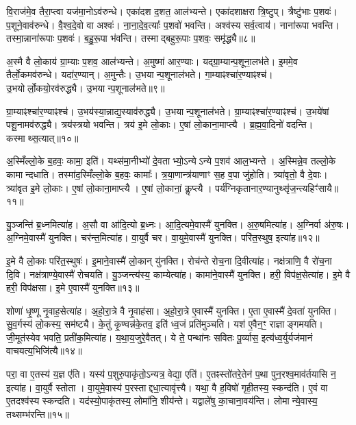 वि॒राज॑मे॒व तैरा॒प्त्वा यज॑मा॒नो\-ऽव॑रुन्धे।
एका॑दश द॒शत॒ आल॑भ्यन्ते।
एका॑दशाक्षरा त्रि॒ष्टुप्।
त्रैष्टु॑भाः प॒शवः॑।
प॒शूने॒वाव॑रुन्धे।
वै॒श्व॒दे॒वो वा अश्वः॑।
ना॒ना॒दे॒व॒त्याः᳚ प॒शवो॑ भवन्ति।
अश्व॑स्य सर्व॒त्वाय॑।
नाना॑रूपा भवन्ति।
तस्मा॒न्नाना॑रूपाः प॒शवः॑।
ब॒हु॒रू॒पा भ॑वन्ति।
तस्माद्बहुरू॒पाः प॒शवः॒ समृ॑द्ध्यै॥८॥\anuvakamend[आ॒र॒ण्याँल्लो॒को द॒शिन॑ आल॒भ्यन्ते॒ नाना॑रूपाः प॒शवो॒ द्वे च॑]

अ॒स्मै वै लो॒काय॑ ग्रा॒म्याः प॒शव॒ आल॑भ्यन्ते।
अ॒मुष्मा॑ आर॒ण्याः।
यद्ग्रा॒म्यान्प॒शूना॒लभ॑ते।
इ॒ममे॒व तैर्लो॒कमव॑रुन्धे।
यदा॑र॒ण्यान्।
अ॒मुन्तैः।
उ॒भयान्प॒शूनाल॑भते।
गा॒म्याꣴश्चा॑र॒ण्याꣴश्च॑।
उ॒भयोर्लो॒कयो॒रव॑रुद्ध्यै।
उ॒भयान्प॒शूनाल॑भते॥९॥

ग्रा॒म्याꣴश्चा॑र॒ण्याꣴश्च॑।
उ॒भय॑स्या॒न्नाद्य॒स्याव॑रुद्ध्यै।
उ॒भयान्प॒शूनाल॑भते।
ग्रा॒म्याꣴश्चा॑र॒ण्याꣴश्च॑।
उ॒भये॑षां पशू॒नामव॑रुद्ध्यै।
त्रय॑स्त्रयो भवन्ति।
त्रय॑ इ॒मे लो॒काः।
ए॒षां लो॒काना॒माप्त्यै।
ब्र॒ह्म॒वा॒दिनो॑ वदन्ति।
कस्माथ्स॒त्यात्॥१०॥

अ॒स्मिँल्लो॒के ब॒हवः॒ कामा॒ इति॑।
यथ्स॑मा॒नीभ्यो॑ दे॒वताभ्यो॒\-ऽन्ये\-ऽन्ये प॒शव॑ आल॒भ्यन्ते।
अ॒स्मिन्ने॒व तल्लो॒के कामान्दधाति।
तस्मा॑द॒स्मिँल्लो॒के ब॒हवः॒ कामाः᳚।
त्र॒या॒णान्त्र॑याणाꣳ स॒ह व॒पा जु॑होति।
त्र्या॑वृतो॒ वै दे॒वाः।
त्र्या॑वृत इ॒मे लो॒काः।
ए॒षां लो॒काना॒माप्त्यै।
ए॒षां लो॒कानां॒ कॢप्त्यै।
पर्य॑ग्निकृतानार॒ण्यानुथ्सृ॑ज॒न्त्यहिꣳ॑सायै॥११॥\anuvakamend[अव॑रुद्ध्या उ॒भयान्प॒शूनाल॑भते स॒त्यादहिꣳ॑सायै]

यु॒ञ्जन्ति॑ ब्र॒ध्नमित्या॑ह।
अ॒सौ वा आ॑दि॒त्यो ब्र॒ध्नः।
आ॒दि॒त्यमे॒वास्मै॑ युनक्ति।
अ॒रु॒षमित्या॑ह।
अ॒ग्निर्वा अ॑रु॒षः।
अ॒ग्निमे॒वास्मै॑ युनक्ति।
चर॑न्त॒मित्या॑ह।
वा॒युर्वै चर\sn{}।
वा॒युमे॒वास्मै॑ युनक्ति।
परि॑त॒स्थुष॒ इत्या॑ह॥१२॥

इ॒मे वै लो॒काः परि॑त॒स्थुषः॑।
इ॒माने॒वास्मै॑ लो॒कान् यु॑नक्ति।
रोच॑न्ते रोच॒ना दि॒वीत्या॑ह।
नक्ष॑त्राणि॒ वै रो॑च॒ना दि॒वि।
नक्ष॑त्राण्ये॒वास्मै॑ रोचयति।
यु॒ञ्जन्त्य॑स्य॒ काम्येत्या॑ह।
कामा॑ने॒वास्मै॑ युनक्ति।
हरी॒ विप॑क्ष॒सेत्या॑ह।
इ॒मे वै हरी॒ विप॑क्षसा।
इ॒मे ए॒वास्मै॑ युनक्ति॥१३॥

शोणा॑ धृ॒ष्णू नृ॒वाह॒सेत्या॑ह।
अ॒हो॒रा॒त्रे वै नृ॒वाह॑सा।
अ॒हो॒रा॒त्रे ए॒वास्मै॑ युनक्ति।
ए॒ता ए॒वास्मै॑ दे॒वता॑ युनक्ति।
सु॒व॒र्गस्य॑ लो॒कस्य॒ सम॑ष्ट्यै।
के॒तुं कृ॒ण्वन्न॑के॒तव॒ इति॑ ध्व॒जं प्रति॑मुञ्चति।
यश॑ ए॒वैन॒ꣳ॒ राज्ञाङ्गमयति।
जी॒मूत॑स्येव भवति॒ प्रती॑क॒मित्या॑ह।
य॒था॒य॒जुरे॒वैतत्।
ये ते॒ पन्था॑नः सवितः पू॒र्व्यास॒ इत्य॑ध्व॒र्युर्यज॑मानं वाचयत्य॒भिजि॑त्यै॥१४॥

परा॒ वा ए॒तस्य॑ य॒ज्ञ ए॑ति।
यस्य॑ प॒शुरु॒पाकृ॑तो॒\-ऽन्यत्र॒ वेद्या॒ एति॑।
ए॒तꣴस्तो॑तरे॒तेन॑ प॒था पुन॒रश्व॒माव॑र्तयासि न॒ इत्या॑ह।
वा॒युर्वै स्तोता।
वा॒युमे॒वास्य॑ प॒रस्ताद्दधा॒त्यावृ॑त्त्यै।
यथा॒ वै ह॒विषो॑ गृही॒तस्य॒ स्कन्द॑ति।
ए॒वं वा ए॒तदश्व॑स्य स्कन्दति।
यद॑स्यो॒पाकृ॑तस्य॒ लोमा॑नि॒ शीय॑न्ते।
यद्वाले॑षु का॒चाना॒वय॑न्ति।
लोमान्ये॒वास्य॒ तथ्सम्भ॑रन्ति॥१५॥

